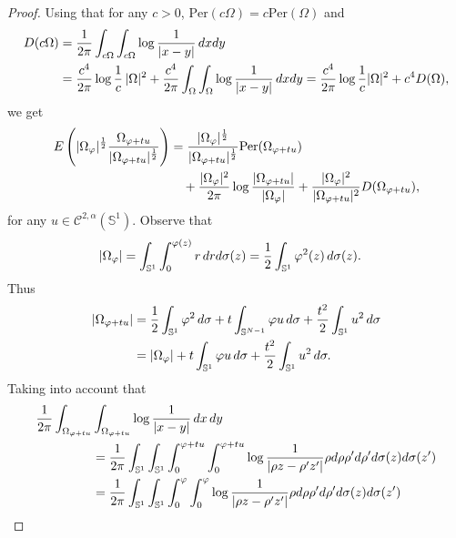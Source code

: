 \documentclass[10pt,reqno,english]{amsart}
\newcommand{\Su}{\mathbb{S}^1}
\newcommand{\be}{\begin{equation}}
\newcommand{\ee}{\end{equation}}
\theoremstyle{definition}
\numberwithin{equation}{section}
\begin{document}
\begin{proof}
Using that for any $c>0$, ${\mbox {Per}} (c \Omega) = c
{\mbox {Per}} ( \Omega)$ and
\begin{align*}
 D(c\Omega)&=\frac{1}{2\pi}\int_{c\Omega}  \int_{c\Omega} \log {1\over |x-y|} \, dx dy \\
 &= \frac{c^4}{2\pi} \log {1\over c}  \, |\Omega|^2 + \frac{c^4}{2\pi} \int_{\Omega}  \int_{\Omega} \log {1\over |x-y|} \, dx dy= \frac{c^4}{2\pi} \log {1\over c} |\Omega|^2+c^4D(\Omega),
\end{align*}
we get
\begin{align*}
E \left( |\Omega_\varphi |^{1\over 2}  {\Omega_{\varphi +t u} \over |\Omega_{\varphi+tu}|^{1\over 2}} \right) &=
          { |\Omega_\varphi |^{1 \over 2} \over |\Omega_{\varphi+tu}|^{1\over 2}} {\mbox {Per}} (\Omega_{\varphi + t u})\\
          &\quad+ { |\Omega_\varphi |^{2} \over 2\pi}\log{|\Omega_{\varphi+tu}|\over |\Omega_{\varphi}|}+{ |\Omega_\varphi |^{2} \over |\Omega_{\varphi+tu}|^{2}}D(\Omega_{\varphi + t u}),
  \end{align*}
  for any $u\in\mathcal C^{2,\alpha}(\Su)$.
    Observe that
    \begin{align*}
        |\Omega_{\varphi} | &= \int_{\mathbb S^{1}} \int_0^{\varphi (z)} r\, dr d\sigma(z) = {1\over 2} \int_{\mathbb S^{1} }
        \varphi^2 (z)\, d\sigma(z).
    \end{align*}
    Thus
    \be
    \label{mis:2D}
  \begin{split}
        |\Omega_{\varphi +tu}|&=   {1\over 2} \int_{\mathbb S^{1} } \varphi^2 \,  d \sigma + t \int_{\mathbb S^{N-1}} \varphi  u  \,  d \sigma  +{t^2\over 2} \int_{\mathbb S^{1} } u^2 \,  d \sigma\\
        &=   |\Omega_{\varphi } | + t \int_{\mathbb S^{1}} \varphi u \,  d \sigma +{t^2\over 2} \int_{\mathbb S^{1} } u^2 \,  d \sigma.
    \end{split} 
    \ee
Taking into account that
\begin{align*}
  \frac{1}{2\pi} \int_{\Omega_{\varphi +tu}}& \int_{\Omega_{\varphi +t u}} \log{1\over |x-y|} \, dx \, dy\\
        &= \frac{1}{2\pi}\int_{\mathbb S^{1}} \int_{\mathbb S^{1}} \int_0^{\varphi + t u}   \int_0^{\varphi + t u}\log{1\over |\rho z - \rho' z'|} \rho  d \rho \rho' d \rho' d \sigma(z) d \sigma(z')\\
       &= \frac{1}{2\pi} \int_{\mathbb S^{1}} \int_{\mathbb S^{1}} \int_0^{\varphi }  \int_0^{\varphi}  \log{1\over |\rho z - \rho' z'|} \rho  d \rho \rho' d \rho' d \sigma(z) d \sigma(z')\\

\end{align*}
\end{proof}
\end{document}
